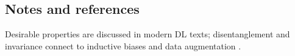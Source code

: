 

\subsection{Notes and references}

Desirable properties are discussed in modern DL texts; disentanglement and invariance connect to inductive biases and data augmentation \textcite{GoodfellowEtAl2016,Prince2023}.
